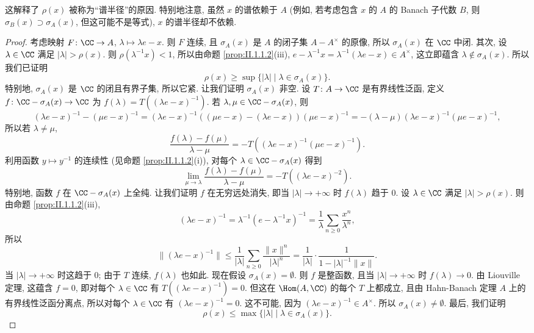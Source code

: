 这解释了 $\rho(x)$ 被称为``谱半径''的原因. 特别地注意, 虽然 $x$ 的谱依赖于 $A$ (例如, 若考虑包含 $x$ 的 $A$ 的 Banach 子代数 $B$, 则 $\sigma_B(x) \supset \sigma_A(x)$, 但这可能不是等式), $x$ 的谱半径却不依赖.

\begin{proof}
考虑映射 $F \colon \CC \to A$, $\lambda \longmapsto \lambda e - x$. 则 $F$ 连续, 且 $\sigma_A(x)$ 是 $A$ 的闭子集 $A - A^{\times}$ 的原像, 所以 $\sigma_A(x)$ 在 $\CC$ 中闭.
其次, 设 $\lambda \in \CC$ 满足 $|\lambda| > \rho(x)$. 则 $\rho(\lambda^{-1}x) < 1$, 所以由命题 \ref{prop:II.1.1.2}(iii), $e - \lambda^{-1}x = \lambda^{-1}(\lambda e - x) \in A^{\times}$, 这立即蕴含 $\lambda \notin \sigma_A(x)$. 所以我们已证明
\[
\rho(x) \geq \sup\{|\lambda| \mid \lambda \in \sigma_A(x)\}.
\]
特别地, $\sigma_A(x)$ 是 $\CC$ 的闭且有界子集, 所以它紧.
让我们证明 $\sigma_A(x)$ 非空. 设 $T \colon A \to \CC$ 是有界线性泛函, 定义 $f \colon \CC - \sigma_A(x) \to \CC$ 为 $f(\lambda) = T((\lambda e - x)^{-1})$. 若 $\lambda, \mu \in \CC - \sigma_A(x)$, 则
\[
(\lambda e - x)^{-1} - (\mu e - x)^{-1} = (\lambda e - x)^{-1}((\mu e - x) - (\lambda e - x))(\mu e - x)^{-1} = -(\lambda - \mu)(\lambda e - x)^{-1}(\mu e - x)^{-1},
\]
所以若 $\lambda \neq \mu$,
\[
\frac{f(\lambda) - f(\mu)}{\lambda - \mu} = -T((\lambda e - x)^{-1}(\mu e - x)^{-1}).
\]
利用函数 $y \longmapsto y^{-1}$ 的连续性 (见命题 \ref{prop:II.1.1.2}(i)), 对每个 $\lambda \in \CC - \sigma_A(x)$ 得到
\[
\lim_{\mu \to \lambda}\frac{f(\lambda) - f(\mu)}{\lambda - \mu} = -T((\lambda e - x)^{-2}).
\]
特别地, 函数 $f$ 在 $\CC - \sigma_A(x)$ 上全纯. 让我们证明 $f$ 在无穷远处消失, 即当 $|\lambda| \to +\infty$ 时 $f(\lambda)$ 趋于 $0$. 设 $\lambda \in \CC$ 满足 $|\lambda| > \rho(x)$. 则由命题 \ref{prop:II.1.1.2}(iii),
\[
(\lambda e - x)^{-1} = \lambda^{-1}(e - \lambda^{-1}x)^{-1} = \frac{1}{\lambda}\sum_{n \geq 0}\frac{x^n}{\lambda^n},
\]
所以
\[
\|(\lambda e - x)^{-1}\| \leq \frac{1}{|\lambda|}\sum_{n \geq 0}\frac{\|x\|^n}{|\lambda|^n} = \frac{1}{|\lambda|}\cdot\frac{1}{1 - |\lambda|^{-1}\|x\|}.
\]
当 $|\lambda| \to +\infty$ 时这趋于 $0$; 由于 $T$ 连续, $f(\lambda)$ 也如此.
现在假设 $\sigma_A(x) = \emptyset$. 则 $f$ 是整函数, 且当 $|\lambda| \to +\infty$ 时 $f(\lambda) \to 0$. 由 Liouville 定理, 这蕴含 $f = 0$, 即对每个 $\lambda \in \CC$ 有 $T((\lambda e - x)^{-1}) = 0$. 但这在 $\Hom(A, \CC)$ 的每个 $T$ 上都成立, 且由 Hahn-Banach 定理 $A$ 上的有界线性泛函分离点, 所以对每个 $\lambda \in \CC$ 有 $(\lambda e - x)^{-1} = 0$. 这不可能, 因为 $(\lambda e - x)^{-1} \in A^{\times}$. 所以 $\sigma_A(x) \neq \emptyset$.
最后, 我们证明
\[
\rho(x) \leq \max\{|\lambda| \mid \lambda \in \sigma_A(x)\}.
\]
\end{proof}
